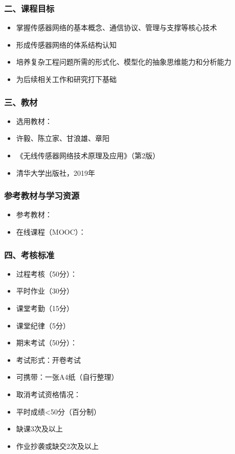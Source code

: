 \documentclass[aspectratio=43]{beamer}
\begin{document}
\begin{frame}
  \frametitle{二、课程目标}

  \begin{itemize}
  \item<+-> 掌握传感器网络的基本概念、通信协议、管理与支撑等核心技术
  \item<+-> 形成传感器网络的体系结构认知
  \item<+-> 培养复杂工程问题所需的形式化、模型化的抽象思维能力和分析能力
  \item<+-> 为后续相关工作和研究打下基础
  \end{itemize}
\end{frame}

\begin{frame}
  \frametitle{三、教材}

  \begin{itemize}
  \item<+-> 选用教材：
  \item<+-> 许毅、陈立家、甘浪雄、章阳
  \item<+-> 《无线传感器网络技术原理及应用》（第2版）
  \item<+-> 清华大学出版社，2019年
  \end{itemize}
\end{frame}

\begin{frame}
  \frametitle{参考教材与学习资源}

  \begin{itemize}
  \item<+-> 参考教材：
  \item<+-> 在线课程（MOOC）：
  \end{itemize}
\end{frame}

\begin{frame}
  \frametitle{四、考核标准}

  \begin{itemize}
  \item<+-> 过程考核（50分）：
  \item<+-> 平时作业（30分）
  \item<+-> 课堂考勤（15分）
  \item<+-> 课堂纪律（5分）
  \item<+-> 期末考试（50分）：
  \item<+-> 考试形式：开卷考试
  \item<+-> 可携带：一张A4纸（自行整理）
  \item<+-> 取消考试资格情况：
  \item<+-> 平时成绩<50分（百分制）
  \item<+-> 缺课3次及以上
  \item<+-> 作业抄袭或缺交2次及以上
  \end{itemize}
\end{frame}
\end{document}
